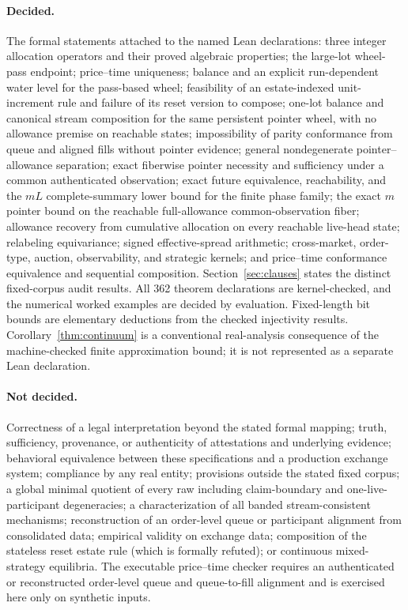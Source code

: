 \documentclass[11pt]{article}
\theoremstyle{definition}
\theoremstyle{remark}
\newcommand{\codeunderscore}{\char`\_\allowbreak}
\newcommand{\lean}[1]{\ifmmode\mathtt{#1}\else{\ttfamily\let\_\codeunderscore #1}\fi}
\begin{document}
\paragraph{Decided.} The formal statements attached to the named Lean declarations: three integer allocation operators and their proved algebraic properties; the large-lot wheel-pass endpoint; price--time uniqueness; balance and an explicit run-dependent water level for the pass-based wheel; feasibility of an estate-indexed unit-increment rule and failure of its reset version to compose; one-lot balance and canonical stream composition for the same persistent pointer wheel, with no allowance premise on reachable states; impossibility of parity conformance from queue and aligned fills without pointer evidence; general nondegenerate pointer--allowance separation; exact fiberwise pointer necessity and sufficiency under a common authenticated observation; exact future equivalence, reachability, and the $mL$ complete-summary lower bound for the finite phase family; the exact $m$ pointer bound on the reachable full-allowance common-observation fiber; allowance recovery from cumulative allocation on every reachable live-head state; relabeling equivariance; signed effective-spread arithmetic; cross-market, order-type, auction, observability, and strategic kernels; and price--time conformance equivalence and sequential composition. Section~\ref{sec:clauses} states the distinct fixed-corpus audit results. All 362 theorem declarations are kernel-checked, and the numerical worked examples are decided by evaluation. Fixed-length bit bounds are elementary deductions from the checked injectivity results. Corollary~\ref{thm:continuum} is a conventional real-analysis consequence of the machine-checked finite approximation bound; it is not represented as a separate Lean declaration.

\paragraph{Not decided.} Correctness of a legal interpretation beyond the stated formal mapping; truth, sufficiency, provenance, or authenticity of attestations and underlying evidence; behavioral equivalence between these specifications and a production exchange system; compliance by any real entity; provisions outside the stated fixed corpus; a global minimal quotient of every raw \lean{WState} including claim-boundary and one-live-participant degeneracies; a characterization of all banded stream-consistent mechanisms; reconstruction of an order-level queue or participant alignment from consolidated data; empirical validity on exchange data; composition of the stateless reset estate rule (which is formally refuted); or continuous mixed-strategy equilibria. The executable price--time checker requires an authenticated or reconstructed order-level queue and queue-to-fill alignment and is exercised here only on synthetic inputs.
\end{document}
